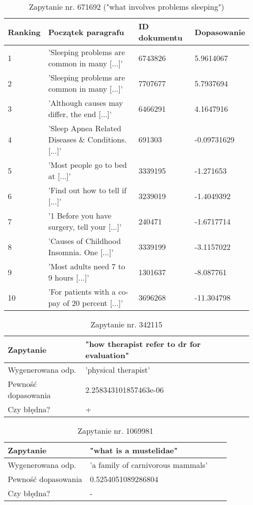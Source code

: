 \begin{table}[htp!]
\centering
\caption{Zapytanie nr. 671692 ("what involves problems sleeping")\protect\footnotemark[2]}
\vspace*{5mm}
\begin{tabular}{llll}
   Ranking & Początek paragrafu & ID dokumentu & Dopasowanie \\
   \hline
    1 & 'Sleeping problems are common in many [...]' & 6743826 & 5.9614067 \\
    2 & 'Sleeping problems are common in many [...]' & 7707677 & 5.7937694 \\
    3 & 'Although causes may differ, the end [...]' & 6466291 & 4.1647916 \\
    4 & 'Sleep Apnea Related Diseases \& Conditions. [...]' & 691303 & -0.09731629 \\
    5 & 'Most people go to bed at [...]' & 3339195 & -1.271653 \\
    6 & 'Find out how to tell if [...]' & 3239019 & -1.4049392\\
    7 & '1 Before you have surgery, tell your [...]' & 240471 & -1.6717714  \\
    8 & 'Causes of Childhood Insomnia. One [...]' & 3339199 & -3.1157022 \\
    9 & 'Most adults need 7 to 9 hours [...]' & 1301637 & -8.087761 \\
    10 & 'For patients with a co-pay of 20 percent [...]' & 3696268 & -11.304798 \\
\end{tabular}
\end{table}

\begin{table}[htp!]
\centering
\caption{Zapytanie nr. 342115\protect\footnotemark[2]}
\vspace*{5mm}
\begin{tabular}{llll}
   Zapytanie & "how therapist refer to dr for evaluation"\\
   \hline
    Wygenerowana odp. & 'physical therapist' \\
    \hline
    Pewność dopasowania &  2.258343101857463e-06\\
    \hline
    Czy błędna? & +\\
\end{tabular}
\end{table}

\begin{table}[htp!]
\centering
\caption{Zapytanie nr. 1069981\protect\footnotemark[2]}
\vspace*{5mm}
\begin{tabular}{llll}
   Zapytanie & "what is a mustelidae"\\
   \hline
    Wygenerowana odp. & 'a family of carnivorous mammals' \\
    \hline
    Pewność dopasowania &  0.5254051089286804\\
    \hline
    Czy błędna? & -\\
\end{tabular}
\end{table}

